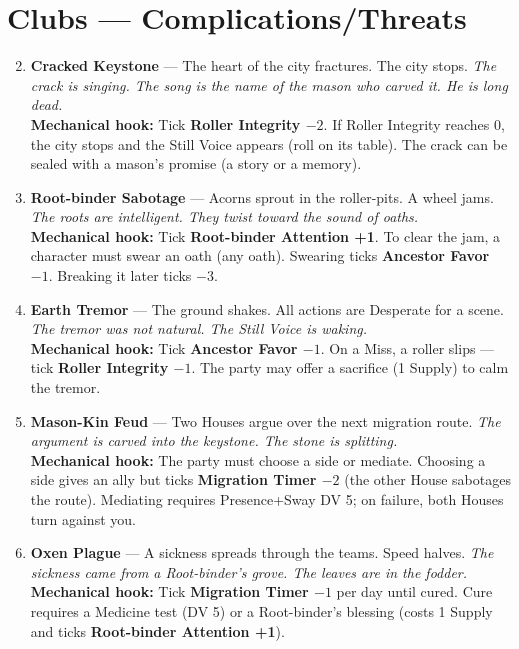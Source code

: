 \section*{Clubs --- Complications/Threats}
\label{sec:ngomebe-complications}
\begin{enumerate}
\setcounter{enumi}{1}
\item \textbf{Cracked Keystone} --- The heart of the city fractures. The city stops.
  \hfill \textit{The crack is singing. The song is the name of the mason who carved it. He is long dead.} \\
  \textbf{Mechanical hook:} Tick \textbf{Roller Integrity $-2$}. If Roller Integrity reaches 0, the city stops and the Still Voice appears (roll on its table). The crack can be sealed with a mason's promise (a story or a memory).

\item \textbf{Root-binder Sabotage} --- Acorns sprout in the roller-pits. A wheel jams.
  \hfill \textit{The roots are intelligent. They twist toward the sound of oaths.} \\
  \textbf{Mechanical hook:} Tick \textbf{Root-binder Attention +1}. To clear the jam, a character must swear an oath (any oath). Swearing ticks \textbf{Ancestor Favor $-1$}. Breaking it later ticks $-3$.

\item \textbf{Earth Tremor} --- The ground shakes. All actions are Desperate for a scene.
  \hfill \textit{The tremor was not natural. The Still Voice is waking.} \\
  \textbf{Mechanical hook:} Tick \textbf{Ancestor Favor $-1$}. On a Miss, a roller slips --- tick \textbf{Roller Integrity $-1$}. The party may offer a sacrifice (1 Supply) to calm the tremor.

\item \textbf{Mason-Kin Feud} --- Two Houses argue over the next migration route.
  \hfill \textit{The argument is carved into the keystone. The stone is splitting.} \\
  \textbf{Mechanical hook:} The party must choose a side or mediate. Choosing a side gives an ally but ticks \textbf{Migration Timer $-2$} (the other House sabotages the route). Mediating requires Presence+Sway DV 5; on failure, both Houses turn against you.

\item \textbf{Oxen Plague} --- A sickness spreads through the teams. Speed halves.
  \hfill \textit{The sickness came from a Root-binder's grove. The leaves are in the fodder.} \\
  \textbf{Mechanical hook:} Tick \textbf{Migration Timer $-1$} per day until cured. Cure requires a Medicine test (DV 5) or a Root-binder's blessing (costs 1 Supply and ticks \textbf{Root-binder Attention +1}).


\end{enumerate}
